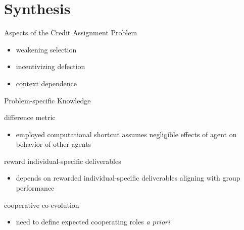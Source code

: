 \section{Synthesis}

\begin{frame}{Aspects of the Credit Assignment Problem}
\begin{itemize}
\item weakening selection \cite{knudson2010coevolution, waibel2009genetic}
\item incentivizing defection \cite{knudson2010coevolution, waibel2009genetic}
\item context dependence \cite{gomes2015cooperative}
\end{itemize}
\end{frame}

\begin{frame}{Problem-specific Knowledge}

difference metric \cite{knudson2010coevolution}
\begin{itemize}
\item employed computational shortcut assumes negligible effects of agent on behavior of other agents
\end{itemize}

reward individual-specific deliverables \cite{waibel2009genetic}
\begin{itemize}
\item depends on rewarded individual-specific deliverables aligning with group performance
\end{itemize}

cooperative co-evolution \cite{gomes2015cooperative}
\begin{itemize}
\item need to define expected cooperating roles \textit{a priori}
\end{itemize}

\end{frame}

